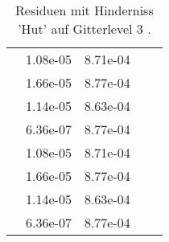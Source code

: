 \begin{table}
\begin{tabular}{c|cc|cc|}
\multicolumn{1}{|c|}{} & \multicolumn{1}{|c|}{  1.08e-05} & \multicolumn{1}{|c|}{  8.71e-04} & \multicolumn{1}{|c|}{} & \multicolumn{1}{|c|}{} \\ 
\multicolumn{1}{|c|}{} & \multicolumn{1}{|c|}{  1.66e-05} & \multicolumn{1}{|c|}{  8.77e-04} & \multicolumn{1}{|c|}{} & \multicolumn{1}{|c|}{} \\ 
\multicolumn{1}{|c|}{} & \multicolumn{1}{|c|}{  1.14e-05} & \multicolumn{1}{|c|}{  8.63e-04} & \multicolumn{1}{|c|}{} & \multicolumn{1}{|c|}{} \\ 
\multicolumn{1}{|c|}{} & \multicolumn{1}{|c|}{  6.36e-07} & \multicolumn{1}{|c|}{  8.77e-04} & \multicolumn{1}{|c|}{} & \multicolumn{1}{|c|}{} \\ 
\multicolumn{1}{|c|}{} & \multicolumn{1}{|c|}{  1.08e-05} & \multicolumn{1}{|c|}{  8.71e-04} & \multicolumn{1}{|c|}{} & \multicolumn{1}{|c|}{} \\ 
\multicolumn{1}{|c|}{} & \multicolumn{1}{|c|}{  1.66e-05} & \multicolumn{1}{|c|}{  8.77e-04} & \multicolumn{1}{|c|}{} & \multicolumn{1}{|c|}{} \\ 
\multicolumn{1}{|c|}{} & \multicolumn{1}{|c|}{  1.14e-05} & \multicolumn{1}{|c|}{  8.63e-04} & \multicolumn{1}{|c|}{} & \multicolumn{1}{|c|}{} \\ 
\multicolumn{1}{|c|}{} & \multicolumn{1}{|c|}{  6.36e-07} & \multicolumn{1}{|c|}{  8.77e-04} & \multicolumn{1}{|c|}{} & \multicolumn{1}{|c|}{} \\ 
\hline 
\end{tabular}\caption{Residuen mit Hinderniss 'Hut' auf Gitterlevel 3 .}\label{tab:Residuum_Hut_level3}
\end{table} 

